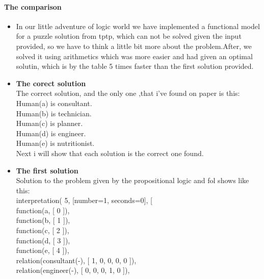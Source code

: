\paragraph{The comparison}
\begin{itemize}
\item
	\tab In our little adventure of logic world we have implemented a functional model for a puzzle solution from tptp, which can not be solved 			given the input provided, so we have to think a little bit more about the problem.After, we solved it using arithmetics which was more easier 			and had given an optimal solutin, which is by the table  5 times faster than the first solution provided.\\	
\item{\textbf{The corect solution}}\\
	\tab The correct solution, and the only one ,that i've found on paper is this:\\
		Human(a) is consultant.\\
		Human(b) is technician.\\
		Human(c) is planner.\\
		Human(d) is engineer.\\
		Human(e) is nutritionist.\\
	\tab Next i will show that each solution is the correct one found.\\

\item{\textbf{The first solution}}\\
		\tab Solution to the problem given by the propositional logic and fol shows like this:\\
		interpretation( 5, [number=1, seconds=0], [\\

       		 function(a, [ 0 ]),\\
		
      		  function(b, [ 1 ]),\\

       		 function(c, [ 2 ]),\\

        function(d, [ 3 ]),\\

        function(e, [ 4 ]),\\

        relation(consultant(-), [ 1, 0, 0, 0, 0 ]),\\

        relation(engineer(-), [ 0, 0, 0, 1, 0 ]),\\


\end{itemize}
